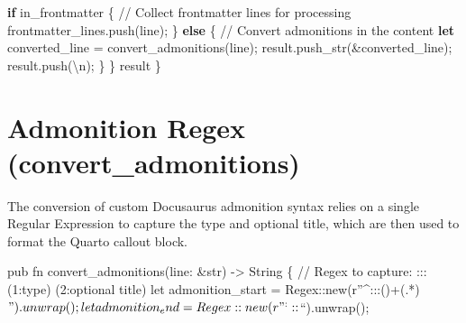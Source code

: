 \documentclass[
  letterpaper,
  DIV=11,
  numbers=noendperiod]{scrreprt}
\newenvironment{Shaded}{\begin{snugshade}}{\end{snugshade}}
\newcommand{\CharTok}[1]{\textcolor[rgb]{0.13,0.47,0.30}{#1}}
\newcommand{\CommentTok}[1]{\textcolor[rgb]{0.37,0.37,0.37}{#1}}
\newcommand{\ControlFlowTok}[1]{\textcolor[rgb]{0.00,0.23,0.31}{\textbf{#1}}}
\newcommand{\KeywordTok}[1]{\textcolor[rgb]{0.00,0.23,0.31}{\textbf{#1}}}
\newcommand{\NormalTok}[1]{\textcolor[rgb]{0.00,0.23,0.31}{#1}}
\newcommand{\OperatorTok}[1]{\textcolor[rgb]{0.37,0.37,0.37}{#1}}
\newcommand{\SpecialCharTok}[1]{\textcolor[rgb]{0.37,0.37,0.37}{#1}}
\begin{document}
\begin{Shaded}
\begin{Highlighting}[]
        \ControlFlowTok{if}\NormalTok{ in\_frontmatter }\OperatorTok{\{}
            \CommentTok{// Collect frontmatter lines for processing}
\NormalTok{            frontmatter\_lines}\OperatorTok{.}\NormalTok{push(line)}\OperatorTok{;}
        \OperatorTok{\}} \ControlFlowTok{else} \OperatorTok{\{}
            \CommentTok{// Convert admonitions in the content}
            \KeywordTok{let}\NormalTok{ converted\_line }\OperatorTok{=}\NormalTok{ convert\_admonitions(line)}\OperatorTok{;}
\NormalTok{            result}\OperatorTok{.}\NormalTok{push\_str(}\OperatorTok{\&}\NormalTok{converted\_line)}\OperatorTok{;}
\NormalTok{            result}\OperatorTok{.}\NormalTok{push(}\CharTok{\textquotesingle{}}\SpecialCharTok{\textbackslash{}n}\CharTok{\textquotesingle{}}\NormalTok{)}\OperatorTok{;}
        \OperatorTok{\}}
    \OperatorTok{\}}
\NormalTok{    result}
\OperatorTok{\}}
\end{Highlighting}
\end{Shaded}

\chapter{Admonition Regex
(convert\_admonitions)}\label{admonition-regex-convert_admonitions}

The conversion of custom Docusaurus admonition syntax relies on a single
Regular Expression to capture the type and optional title, which are
then used to format the Quarto callout block.

pub fn convert\_admonitions(line: \&str) -\textgreater{} String \{ //
Regex to capture: ::: (1:type) (2:optional title) let admonition\_start
= Regex::new(r''\^{}:::(\w)+(.*)\(").unwrap();
    let admonition_end = Regex::new(r"^:::\)``).unwrap();
\end{document}
